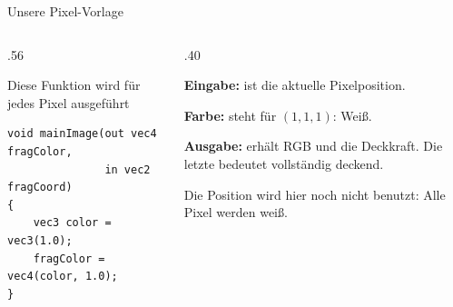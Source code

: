 \begin{frame}[fragile,label=pixelvorlage]{Unsere Pixel-Vorlage}
\small
{}\par\vspace{2mm}
\begin{columns}[T,onlytextwidth]
\begin{column}{.56\textwidth}
\begin{block}{Diese Funktion wird für jedes Pixel ausgeführt}
\begin{verbatim}
void mainImage(out vec4 fragColor,
               in vec2 fragCoord)
{
    vec3 color = vec3(1.0);
    fragColor = vec4(color, 1.0);
}
\end{verbatim}
\end{block}
\end{column}
\begin{column}{.40\textwidth}
{\small
\textbf{Eingabe:}  ist die aktuelle Pixelposition.\par\medskip
\textbf{Farbe:}  steht für $(1,1,1)$: Weiß.\par\medskip
\textbf{Ausgabe:}  erhält RGB und die Deckkraft. Die letzte  bedeutet vollständig deckend.\par\medskip
Die Position wird hier noch nicht benutzt: Alle Pixel werden weiß.}
\end{column}
\end{columns}
\end{frame}

